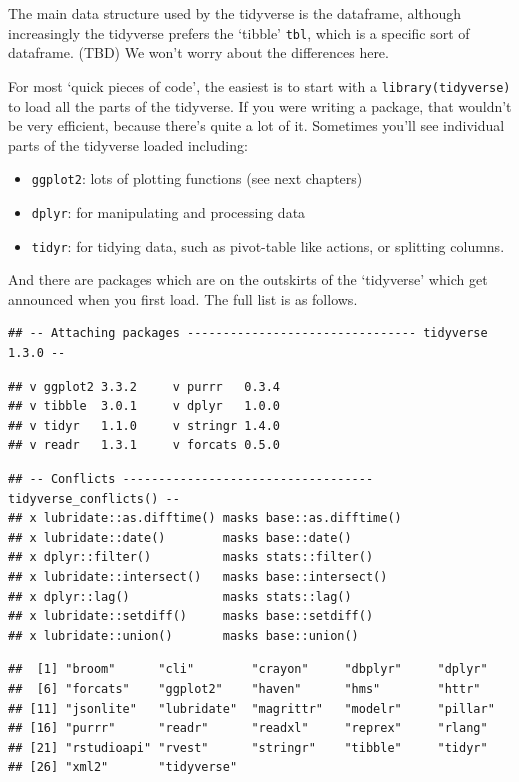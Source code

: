 \documentclass[
]{book}
\providecommand{\tightlist}{%
  \setlength{\itemsep}{0pt}\setlength{\parskip}{0pt}}
\begin{document}
The main data structure used by the tidyverse is the dataframe, although increasingly the tidyverse prefers the `tibble' \texttt{tbl}, which is a specific sort of dataframe. (TBD) We won't worry about the differences here.

For most `quick pieces of code', the easiest is to start with a \texttt{library(tidyverse)} to load all the parts of the tidyverse. If you were writing a package, that wouldn't be very efficient, because there's quite a lot of it. Sometimes you'll see individual parts of the tidyverse loaded including:

\begin{itemize}
\tightlist
\item
  \texttt{ggplot2}: lots of plotting functions (see next chapters)
\item
  \texttt{dplyr}: for manipulating and processing data
\item
  \texttt{tidyr}: for tidying data, such as pivot-table like actions, or splitting columns.
\end{itemize}

And there are packages which are on the outskirts of the `tidyverse' which get announced when you first load. The full list is as follows.

\begin{verbatim}
## -- Attaching packages -------------------------------- tidyverse 1.3.0 --
\end{verbatim}

\begin{verbatim}
## v ggplot2 3.3.2     v purrr   0.3.4
## v tibble  3.0.1     v dplyr   1.0.0
## v tidyr   1.1.0     v stringr 1.4.0
## v readr   1.3.1     v forcats 0.5.0
\end{verbatim}

\begin{verbatim}
## -- Conflicts ----------------------------------- tidyverse_conflicts() --
## x lubridate::as.difftime() masks base::as.difftime()
## x lubridate::date()        masks base::date()
## x dplyr::filter()          masks stats::filter()
## x lubridate::intersect()   masks base::intersect()
## x dplyr::lag()             masks stats::lag()
## x lubridate::setdiff()     masks base::setdiff()
## x lubridate::union()       masks base::union()
\end{verbatim}

\begin{verbatim}
##  [1] "broom"      "cli"        "crayon"     "dbplyr"     "dplyr"     
##  [6] "forcats"    "ggplot2"    "haven"      "hms"        "httr"      
## [11] "jsonlite"   "lubridate"  "magrittr"   "modelr"     "pillar"    
## [16] "purrr"      "readr"      "readxl"     "reprex"     "rlang"     
## [21] "rstudioapi" "rvest"      "stringr"    "tibble"     "tidyr"     
## [26] "xml2"       "tidyverse"
\end{verbatim}
\end{document}
